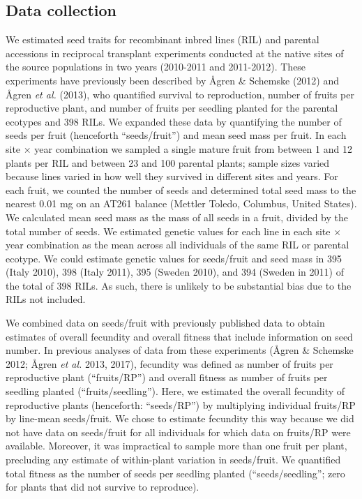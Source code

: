 \documentclass[]{article}
\begin{document}
\hypertarget{data-collection}{%
\subsection{Data collection}\label{data-collection}}

We estimated seed traits for recombinant inbred lines (RIL) and parental accessions in reciprocal transplant experiments conducted at the native sites of the source populations in two years (2010-2011 and 2011-2012). These experiments have previously been described by Ågren \& Schemske (2012) and Ågren \emph{et al.} (2013), who quantified survival to reproduction, number of fruits per reproductive plant, and number of fruits per seedling planted for the parental ecotypes and 398 RILs. We expanded these data by quantifying the number of seeds per fruit (henceforth ``seeds/fruit'') and mean seed mass per fruit. In each site × year combination we sampled a single mature fruit from between 1 and 12 plants per RIL and between 23 and 100 parental plants; sample sizes varied because lines varied in how well they survived in different sites and years. For each fruit, we counted the number of seeds and determined total seed mass to the nearest 0.01 mg on an AT261 balance (Mettler Toledo, Columbus, United States). We calculated mean seed mass as the mass of all seeds in a fruit, divided by the total number of seeds. We estimated genetic values for each line in each site × year combination as the mean across all individuals of the same RIL or parental ecotype. We could estimate genetic values for seeds/fruit and seed mass in 395 (Italy 2010), 398 (Italy 2011), 395 (Sweden 2010), and 394 (Sweden in 2011) of the total of 398 RILs. As such, there is unlikely to be substantial bias due to the RILs not included.

We combined data on seeds/fruit with previously published data to obtain estimates of overall fecundity and overall fitness that include information on seed number. In previous analyses of data from these experiments (Ågren \& Schemske 2012; Ågren \emph{et al.} 2013, 2017), fecundity was defined as number of fruits per reproductive plant (``fruits/RP'') and overall fitness as number of fruits per seedling planted (``fruits/seedling''). Here, we estimated the overall fecundity of reproductive plants (henceforth: ``seeds/RP'') by multiplying individual fruits/RP by line-mean seeds/fruit. We chose to estimate fecundity this way because we did not have data on seeds/fruit for all individuals for which data on fruits/RP were available. Moreover, it was impractical to sample more than one fruit per plant, precluding any estimate of within-plant variation in seeds/fruit. We quantified total fitness as the number of seeds per seedling planted (``seeds/seedling''; zero for plants that did not survive to reproduce).
\end{document}
